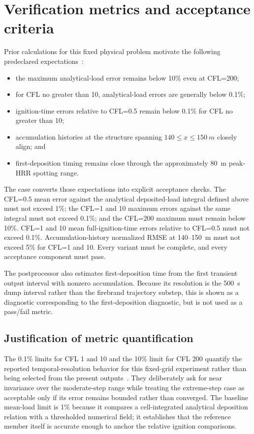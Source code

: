 \section{Verification metrics and acceptance criteria}

Prior calculations for this fixed physical problem motivate the following
predeclared expectations~\cite{Qin2025}:
\begin{itemize}
\item the maximum analytical-load error remains below 10\% even at CFL=200;
\item for CFL no greater than 10, analytical-load errors are generally below
0.1\%;
\item ignition-time errors relative to CFL=0.5 remain below 0.1\% for CFL no
greater than 10;
\item accumulation histories at the structure spanning
\(140\le x\le\SI{150}{m}\) closely align; and
\item first-deposition timing remains close through the approximately
\SI{80}{m} peak-HRR spotting range.
\end{itemize}

The case converts those expectations into explicit acceptance checks. The
CFL=0.5 mean error against the analytical deposited-load integral defined
above must not exceed 1\%; the CFL=1 and 10 maximum errors against the same
integral must not exceed 0.1\%; and the CFL=200 maximum must remain below
10\%. CFL=1 and 10 mean full-ignition-time errors relative to CFL=0.5 must not
exceed 0.1\%. Accumulation-history normalized RMSE at 140--150~m must not
exceed 5\% for CFL=1 and 10. Every variant must be complete, and every
acceptance component must pass.

The postprocessor also estimates first-deposition time from the first transient
output interval with nonzero accumulation. Because its resolution is the
\SI{500}{s} dump interval rather than the firebrand trajectory substep, this is
shown as a diagnostic corresponding to the first-deposition diagnostic, but is not used as a
pass/fail metric.


\subsection{Justification of metric quantification}

The 0.1\% limits for CFL 1 and 10 and the 10\% limit for CFL 200 quantify the
reported temporal-resolution behavior for this fixed-grid experiment rather
than being selected from the present outputs~\cite{Qin2025}.  They deliberately
ask for near invariance over the moderate-step range while treating the
extreme-step case as acceptable only if its error remains bounded rather than
converged.  The baseline mean-load limit is 1\% because it compares a
cell-integrated analytical deposition relation with a thresholded numerical
field; it establishes that the reference member itself is accurate enough to
anchor the relative ignition comparisons.

